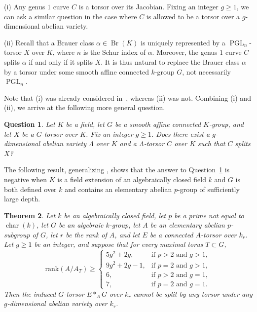 \documentclass[12pt]{amsart}
\numberwithin{equation}{section}
\newtheorem{theorem}{Theorem}[section]
\newtheorem{question}[theorem]{Question}
\theoremstyle{remark}
\newcommand{\PGL}{\operatorname{PGL}}
\newcommand{\Br}{\operatorname{Br}}
\begin{document}
\smallskip
(i) Any genus $1$ curve $C$ is a torsor over its Jacobian. Fixing an integer $g \geqslant 1$, we can ask a similar question in the case where $C$ is allowed to be a torsor over a $g$-dimensional abelian variety. 

\smallskip
(ii) Recall that
a Brauer class $\alpha \in \Br(K)$ is uniquely represented by a $\PGL_n$-torsor
$X$ over $K$, where $n$ is the Schur index of $\alpha$. Moreover, the genus $1$ curve $C$ splits $\alpha$ if and only if it splits $X$. It is thus natural to replace the Brauer class $\alpha$ by a torsor under some smooth affine connected $k$-group $G$, not necessarily $\PGL_n$. 

\smallskip
\noindent Note that (i) was already considered in~\cite{genus1}, whereas (ii) was not. Combining (i) and (ii), we arrive at the following more general question.

	\begin{question} \label{question-clark-saltman2}
    Let $K$ be a field, let $G$ be a smooth affine connected $K$-group, and let
    $X$ be a $G$-torsor over $K$. Fix an integer $g \geqslant 1$.  Does there exist a $g$-dimensional abelian variety $\Lambda$ over $K$ and a $\Lambda$-torsor $C$ over $K$ such that $C$ splits $X$?
    \end{question}

 The following result, generalizing \cite[Theorem 1.2]{genus1}, shows that the answer to Question~\ref{question-clark-saltman2} is negative when $K$ is a field extension of an algebraically closed field $k$ and $G$ is both defined over $k$ and contains an elementary abelian $p$-group of sufficiently large depth.
 
\begin{theorem}\label{thm.non-toral-obstruction}
Let $k$ be an algebraically closed field, let $p$ be a prime not equal to
$\operatorname{char}(k)$, let $G$ be an algebraic $k$-group, let $A$ be an elementary abelian $p$-subgroup of $G$, let $r$ be the rank of $A$, and let $E$ be a connected $A$-torsor over $k_r$. Let $g\geqslant 1$ be an integer, and suppose that for every maximal torus $T\subset G$,
\[
        \mathrm{rank}(A/A_T) \geqslant 
        \begin{cases}
        5g^2+2g, & \text{if } p>2 \text{ and } g>1,\\[2mm]
        9g^2+2g-1, & \text{if } p=2 \text{ and } g>1,\\[2mm]
        6, & \text{if } p>2 \text{ and } g=1,\\[2mm]
        7, & \text{if } p=2 \text{ and } g=1.
        \end{cases}
\]
Then the induced $G$-torsor $E*_AG$ over $k_r$ cannot be split by any torsor under any $g$-dimensional abelian variety over $k_r$.
\end{theorem}
\end{document}
